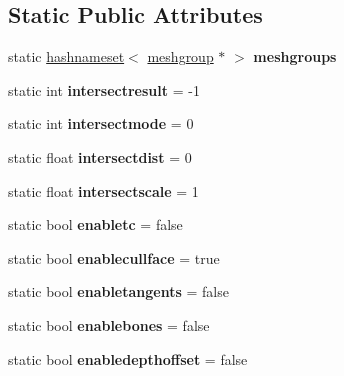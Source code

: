 \subsection*{Static Public Attributes}
\begin{DoxyCompactItemize}
\item 
\mbox{\label{structanimmodel_a181da0ce12df773f0de1a1d898273f37}} 
static \hyperlink{structhashnameset}{hashnameset}$<$ \hyperlink{structanimmodel_1_1meshgroup}{meshgroup} $\ast$ $>$ {\bfseries meshgroups}
\item 
\mbox{\label{structanimmodel_ac74538f269270334cf403c697624f3fb}} 
static int {\bfseries intersectresult} = -\/1
\item 
\mbox{\label{structanimmodel_ac094dcd7721756ef3c3091c278896327}} 
static int {\bfseries intersectmode} = 0
\item 
\mbox{\label{structanimmodel_a4065ef765537c60c20811d2d42bad0c7}} 
static float {\bfseries intersectdist} = 0
\item 
\mbox{\label{structanimmodel_a74c1c90c044a25d6d343ef00f24932b7}} 
static float {\bfseries intersectscale} = 1
\item 
\mbox{\label{structanimmodel_a9b4ab567a3f007b99d8088360f68d625}} 
static bool {\bfseries enabletc} = false
\item 
\mbox{\label{structanimmodel_a867aef2be2160bdef6e4c43ea5852a98}} 
static bool {\bfseries enablecullface} = true
\item 
\mbox{\label{structanimmodel_a914a36c32c8243c35e638082cc144f2f}} 
static bool {\bfseries enabletangents} = false
\item 
\mbox{\label{structanimmodel_abdbbd486c1faab279c4f9e9e3180402a}} 
static bool {\bfseries enablebones} = false
\item 
\mbox{\label{structanimmodel_a0f5336b1cdf6c0cad6847711aa5871dc}} 
static bool {\bfseries enabledepthoffset} = false
\item 

\end{DoxyCompactItemize}
